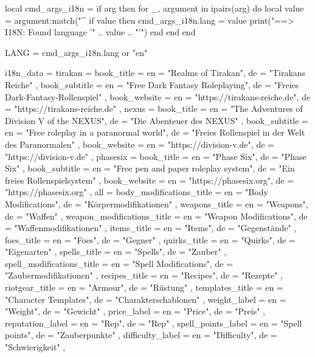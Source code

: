 \usepackage{luacode}
\usepackage{etoolbox}

\begin{luacode*}
local cmd_args_i18n = {}
if arg then
    for _, argument in ipairs(arg) do
        local value = argument:match("^%
        if value then
            cmd_args_i18n.lang = value
            print("==> I18N: Found language '" .. value .. "'")
        end
    end
end

LANG = cmd_args_i18n.lang or "en"

i18n_data = {
    tirakan = {
        book_title = { en = "Realms of Tirakan", de = "Tirakans Reiche" },
        book_subtitle = { en = "Free Dark Fantasy Roleplaying", de = "Freies Dark-Fantasy-Rollenspiel" },
        book_website = { en = "https://tirakans-reiche.de", de = "https://tirakans-reiche.de" }
    },
    nexus = {
        book_title      = { en = "The Adventures of Division V of the NEXUS", de = "Die Abenteuer des NEXUS" },
        book_subtitle   = { en = "Free roleplay in a paranormal world", de = "Freies Rollenspiel in der Welt des Paranormalen" },
        book_website    = { en = "https://division-v.de", de = "https://division-v.de" }
    },
    phasesix = {
        book_title      = { en = "Phase Six", de = "Phase Six" },
        book_subtitle   = { en = "Free pen and paper roleplay system", de = "Ein freies Rollenspielsystem" },
        book_website    = { en = "https://phasesix.org", de = "https://phasesix.org" }
    },
    all = {
        body_modifications_title = { en = "Body Modifications", de = "Körpermodifikationen" },
        weapons_title = { en = "Weapons", de = "Waffen" },
        weapon_modifications_title = { en = "Weapon Modifications", de = "Waffenmodifikationen" },
        items_title = { en = "Items", de = "Gegenstände" },
        foes_title = { en = "Foes", de = "Gegner" },
        quirks_title = { en = "Quirks", de = "Eigenarten" },
        spells_title = { en = "Spells", de = "Zauber" },
        spell_modifications_title = { en = "Spell Modifications", de = "Zaubermodifikationen" },
        recipes_title = { en = "Recipes", de = "Rezepte" },
        riotgear_title = { en = "Armour", de = "Rüstung" },
        templates_title = { en = "Character Templates", de = "Charakterschablonen" },
        weight_label = { en = "Weight", de = "Gewicht" },
        price_label = { en = "Price", de = "Preis" },
        reputation_label = { en = "Rep", de = "Rep" },
        spell_points_label = { en = "Spell points", de = "Zauberpunkte" },
        difficulty_label = { en = "Difficulty", de = "Schwierigkeit" },
}}
\end{luacode*}

